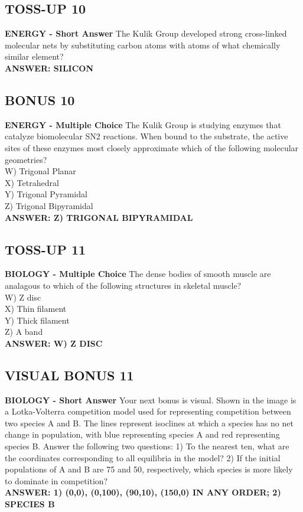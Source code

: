\documentclass{article}
\begin{document}
\subsection*{TOSS-UP 10}
\textbf{ENERGY - Short Answer} The Kulik Group developed strong cross-linked molecular nets by substituting carbon atoms with atoms of what chemically similar element? \\
\textbf{ANSWER: SILICON}

\subsection*{BONUS 10}
\textbf{ENERGY - Multiple Choice} The Kulik Group is studying enzymes that catalyze biomolecular SN2 reactions. When bound to the substrate, the active sites of these enzymes most closely approximate which of the following molecular geometries? \\
W) Trigonal Planar \\
X) Tetrahedral \\
Y) Trigonal Pyramidal \\
Z) Trigonal Bipyramidal \\
\textbf{ANSWER: Z) TRIGONAL BIPYRAMIDAL}

\subsection*{TOSS-UP 11}
\textbf{BIOLOGY - Multiple Choice} The dense bodies of smooth muscle are analagous to which of the following structures in skeletal muscle? \\
W) Z disc \\
X) Thin filament \\
Y) Thick filament \\
Z) A band \\
\textbf{ANSWER: W) Z DISC}

\subsection*{VISUAL BONUS 11}
\textbf{BIOLOGY - Short Answer} Your next bonus is visual. Shown in the image is a Lotka-Volterra competition model used for representing competition between two species A and B. The lines represent isoclines at which a species has no net change in population, with blue representing species A and red representing species B. Answer the following two questions:
1) To the nearest ten, what are the coordinates corresponding to all equilibria in the model?
2) If the initial populations of A and B are 75 and 50, respectively, which species is more likely to dominate in competition? \\
\textbf{ANSWER: 1) (0,0), (0,100), (90,10), (150,0) IN ANY ORDER; 2) SPECIES B}
\end{document}
